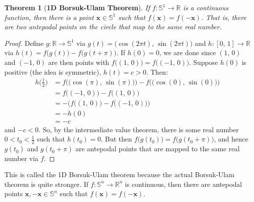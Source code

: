 \documentclass{article}
\theoremstyle{plain}
\newtheorem{theorem}{Theorem}[section]
\theoremstyle{normal}
\begin{document}
         \begin{theorem}[\textbf{1D Borsuk-Ulam Theorem}]
            If $f:\mathbb{S}^{1}\rightarrow\mathbb{R}$ is a continuous
            function, then there is a point $\mathbf{x}\in\mathbb{S}^{1}$ such
            that $f(\mathbf{x})=f(-\mathbf{x})$. That is, there are two
            antepodal points on the circle that map to the same real number.
         \end{theorem}
         \begin{proof}
            Define $g:\mathbb{R}\rightarrow\mathbb{S}^{1}$ via
            $g(t)=\big(\cos(2\pi{t}),\,\sin(2\pi{t})\big)$ and
            $h:[0,\,1]\rightarrow\mathbb{R}$ via
            $h(t)=f\big(g(t)\big)-f\big(g(t+\pi)\big)$. If $h(0)=0$, we
            are done since $(1,\,0)$ and $(-1,\,0)$ are then points with
            $f\big((1,\,0)\big)=f\big((-1,\,0)\big)$. Suppose $h(0)$ is positive
            (the idea is symmetric), $h(t)=c>0$. Then:
            \begin{align}
                h\big(\frac{1}{2}\big)
                &=f\Big(\big(\cos(\pi),\,\sin(\pi)\big)\Big)-
                    f\big(\big(\cos(0),\,\sin(0)\big)\Big)\\
                &=f\big((-1,\,0)\big)-f\big((1,\,0)\big)\\
                &=-\Big(f\big((1,\,0)\big)-f\big((-1,\,0)\big)\Big)\\
                &=-h(0)\\
                &=-c
            \end{align}
            and $-c<0$. So, by the intermediate value theorem, there is some
            real number $0<t_{0}<\frac{1}{2}$ such that $h(t_{0})=0$. But then
            $f\big(g(t_{0})\big)=f\big(g(t_{0}+\pi)\big)$, and hence
            $g(t_{0})$ and $g(t_{0}+\pi)$ are antepodal points that are mapped
            to the same real number via $f$.
         \end{proof}
         This is called the 1D Borsuk-Ulam theorem because the actual
         Borsuk-Ulam theorem is quite stronger. If
         $f:\mathbb{S}^{n}\rightarrow\mathbb{R}^{n}$ is continuous, then there
         are antepodal points $\mathbf{x},-\mathbf{x}\in\mathbb{S}^{n}$ such
         that $f(\mathbf{x})=f(-\mathbf{x})$.
\end{document}
